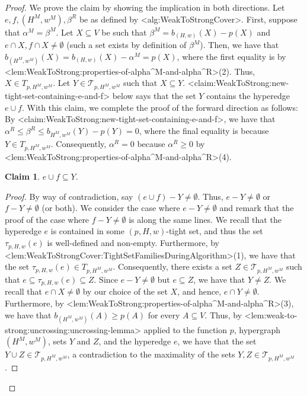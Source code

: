\documentclass{article}
\def\Cref#1{<#1>}%
\newtheorem{claim}{Claim}[section]
\newcommand{\maximalTightSetFamily}[1]{\ensuremath{\calT_{#1}}\xspace}
\newcommand{\tightSetFamily}[1]{\ensuremath{T_{#1}}\xspace}
\newcommand{\knote}[1]{{\color{red}[{\tiny Karthik: \bf #1}]\marginpar{\color{red}*}}}
\newcommand{\maximalTightSetContainingHyperedge}[1]{\ensuremath{\tau_{#1}}\xspace}
\providecommand{\calT}{\mathcal{T}}
\begin{document}
\begin{proof}
    We prove the claim by showing the implication in both directions. Let $e, f, (H^M, w^M), \beta^R$ be as defined by \Cref{alg:WeakToStrongCover}. 
    First, suppose that $\alpha^M = \beta^M$. Let $X \subseteq V$ be such that $\beta^M = b_{(H,w)}(X) - p(X)$ and $e\cap X, f\cap X \not = \emptyset$ (such a set exists by definition of $\beta^M$). Then, we have that
    $b_{(H^M,w^M)}(X) = b_{(H,w)}(X) - \alpha^M = p(X)$, where the first equality is by \Cref{lem:WeakToStrong:properties-of-alpha^M-and-alpha^R}(2). Thus, $X \in \tightSetFamily{p, H^M, w^M}$. Let $Y \in \maximalTightSetFamily{p, H^M, w^M}$ such that $X \subseteq Y$. \Cref{claim:WeakToStrong:new-tight-set-containing-e-and-f} below says that the set $Y$ contains the hyperedge $e \cup f$. With this claim, we complete the proof of the forward direction as follows: By \Cref{claim:WeakToStrong:new-tight-set-containing-e-and-f}, we have that $\alpha^R \leq \beta^R \leq b_{H^M,w^M}(Y) - p(Y) = 0$, where the final equality is because $Y \in \tightSetFamily{p, H^M, w^M}$. Consequently, $\alpha^R = 0$ because $\alpha^R \geq 0$ by \Cref{lem:WeakToStrong:properties-of-alpha^M-and-alpha^R}(4). 
\begin{claim}\label{claim:WeakToStrong:new-tight-set-containing-e-and-f}
       $e \cup f \subseteq Y$.
    \end{claim}
    \begin{proof}
    By way of contradiction, say $(e\cup f) - Y \not = \emptyset$. Thus, $e - Y \not = \emptyset$ or $f - Y \not = \emptyset$ (or both). We consider the case where $e - Y \not = \emptyset$ and remark that the proof of the case where $f - Y \not = \emptyset$ is along the same lines.
        We recall that the hyperedge $e$ is contained in some $(p, H, w)$-tight set, and thus the set $\maximalTightSetContainingHyperedge{p, H, w}(e)$ is well-defined and non-empty. Furthermore, by \Cref{lem:WeakToStrongCover:TightSetFamiliesDuringAlgorithm}(1), we have that the set $\maximalTightSetContainingHyperedge{p, H, w}(e) \in \tightSetFamily{p, H^M, w^M}$. Consequently, there exists a set $Z \in \maximalTightSetFamily{p, H^M, w^M}$ such that $e \subseteq \maximalTightSetContainingHyperedge{p, H, w}(e) \subseteq Z$. Since $e - Y \not = \emptyset$ but $e \subseteq Z$, we have that $Y \not = Z$.  We recall that $e \cap X \not = \emptyset$ by our choice of the set $X$, and hence, $e \cap Y \not = \emptyset$. Furthermore, by \Cref{lem:WeakToStrong:properties-of-alpha^M-and-alpha^R}(3), we have that $b_{(H^M, w^M)}(A) \geq p(A)$ for every $A \subseteq V$. Thus, by \Cref{lem:weak-to-strong:uncrossing:uncrossing-lemma} applied to the function $p$, hypergraph $(H^M, w^M)$, sets $Y$ and $Z$, and the hyperedge $e$, we have that the set $Y \cup Z \in \maximalTightSetFamily{p, H^M, w^M}$, a contradiction to the maximality of the sets $Y, Z \in \maximalTightSetFamily{p, H^M, w^M}$.
    \end{proof}
    

\end{proof}
\end{document}
